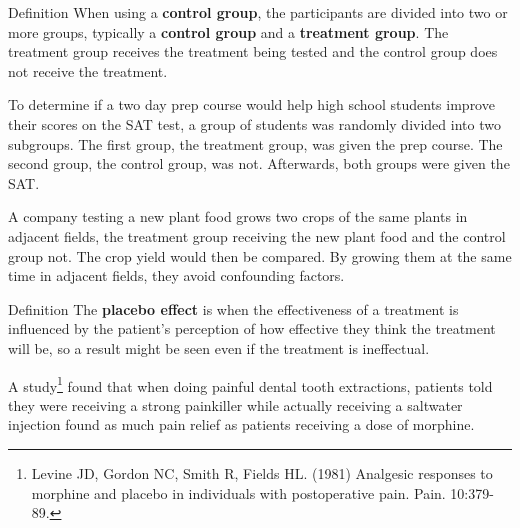 \documentclass{beamer}
\begin{document}
\begin{frame}
\begin{block}{Definition}
When using a \textbf{control group}, the participants are divided into two or more groups, typically a \textbf{control group} and a \textbf{treatment group}. The treatment group receives the treatment being tested and the control group does not receive the treatment.
\end{block}\pause

\begin{example}
To determine if a two day prep course would help high school students improve their scores on the SAT test, a group of students was randomly divided into two subgroups. The first group, the treatment group, was given the prep course. The second group, the control group, was not. Afterwards, both groups were given the SAT\@. 
\end{example}\pause 

\begin{example}
A company testing a new plant food grows two crops of the same plants in adjacent fields, the treatment group receiving the new plant food and the control group not. The crop yield would then be compared. By growing them at the same time in adjacent fields, they avoid confounding factors.
\end{example}
\end{frame}

\begin{frame}
\begin{block}{Definition}
The \textbf{placebo effect} is when the effectiveness of a treatment is influenced by the patient's perception of how effective they think the treatment will be, so a result might be seen even if the treatment is ineffectual.
\end{block}\pause

\begin{example}
A study\footnote[frame]{Levine JD, Gordon NC, Smith R, Fields HL\@. (1981) Analgesic responses to morphine and placebo in individuals with postoperative pain. Pain. 10:379-89.} found that when doing painful dental tooth extractions, patients told they were receiving a strong painkiller while actually receiving a saltwater injection found as much pain relief as patients receiving a dose of morphine.
\end{example}
\end{frame}
\end{document}
